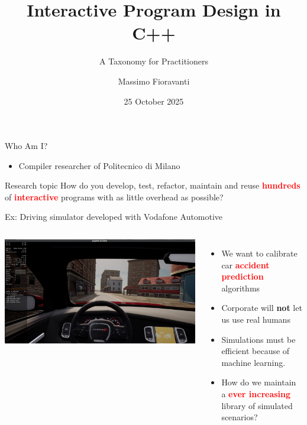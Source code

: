 \documentclass[aspectratio=169,11pt]{beamer}
\title[Interactive Program Design in C++]{Interactive Program Design in C++}
\subtitle{A Taxonomy for Practitioners}
\author[Your Name]{Massimo Fioravanti}
\institute{Politecnico di Milano}
\date{25 October 2025}
\begin{document}
\begin{frame}[plain]
  \titlepage
\end{frame}

\begin{frame}{Who Am I?}
  \begin{itemize}
    \item Compiler researcher of Politecnico di Milano
  \end{itemize}
  \begin{block}{Research topic}
      How do you develop, test, refactor, maintain and reuse \textbf{\textcolor{red}{hundreds}}  of \textbf{\textcolor{red}{interactive}} programs with as little overhead as possible?
  \end{block}
\end{frame}

\begin{frame}{Ex: Driving simulator developed with Vodafone Automotive}
\noindent
\begin{columns}[T, onlytextwidth]
  \includegraphics[height=\textheight, keepaspectratio, width=\linewidth]{CARLAScreenshot.png}
    \begin{itemize}
        \item We want to calibrate car \textbf{\textcolor{red}{accident prediction}} algorithms
        \item Corporate will \textbf{not} let us use real humans 
        \item Simulations must be efficient because of machine learning.
        \item How do we maintain a \textbf{\textcolor{red}{ever increasing}} library of simulated scenarios?
    \end{itemize}
\end{columns}

\end{frame}
\end{document}
